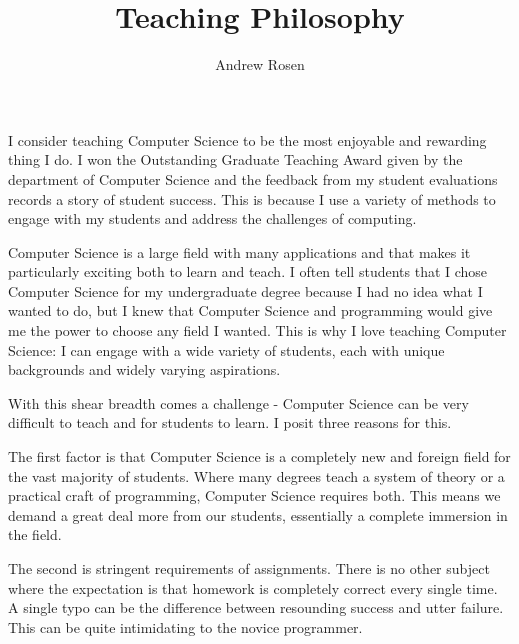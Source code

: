 \documentclass[12pt,a4paper]{article}
\author{Andrew Rosen}
\title{Teaching Philosophy}
\date{}
\begin{document}
\maketitle


I consider teaching Computer Science to be the most enjoyable and rewarding thing I do.
I won the Outstanding Graduate Teaching Award given by the department of Computer Science and the feedback from my  student evaluations records a story of student success. 
This is because I use a variety of methods to engage with my students and address the challenges of computing.



% 


Computer Science is a large field with many applications and that makes it particularly exciting both to learn and teach.
I often tell students that I chose Computer Science for my undergraduate degree because I had no idea what I wanted to do, but I knew that Computer Science and programming would give me the power to choose any field I wanted.
This is why I love teaching Computer Science:  I can engage with a wide variety of students, each with unique backgrounds and widely varying aspirations.

With this shear breadth comes a challenge - Computer Science can be very difficult to teach and for students to learn.
I posit three reasons for this.

The first factor is that Computer Science is a completely new and foreign field for the vast majority of students.
Where many degrees teach a system of theory or a practical craft of programming, Computer Science requires both. 
This means we demand a great deal more from our students, essentially a complete immersion in the field.

The second is stringent requirements of assignments.
There is no other subject where the expectation is that homework is completely correct every single time.
A single typo can be the difference between resounding success and utter failure.
This can be quite intimidating to the novice programmer.
\end{document}

